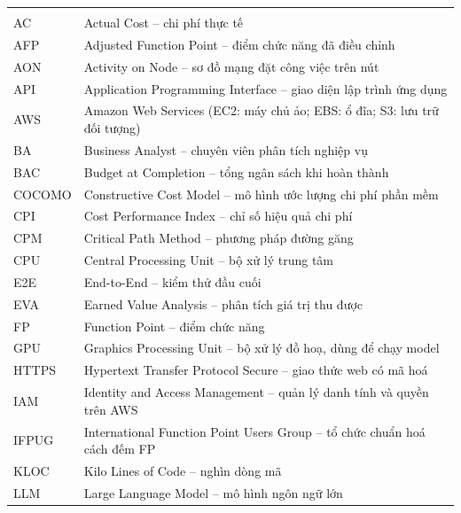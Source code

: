 \documentclass[12pt,a4paper]{report}
\begin{document}
\begingroup
  \begin{longtable}{@{}P{2.2cm}P{13.2cm}@{}}
    \toprule
     &  \\
    \midrule
    \endfirsthead
    \toprule
     &  \\
    \midrule
    \endhead
    \bottomrule
    \endlastfoot
    AC     & Actual Cost -- chi phí thực tế \\
    AFP    & Adjusted Function Point -- điểm chức năng đã điều chỉnh \\
    AON    & Activity on Node -- sơ đồ mạng đặt công việc trên nút \\
    API    & Application Programming Interface -- giao diện lập trình ứng dụng \\
    AWS    & Amazon Web Services (EC2: máy chủ ảo; EBS: ổ đĩa; S3: lưu trữ đối tượng) \\
    BA     & Business Analyst -- chuyên viên phân tích nghiệp vụ \\
    BAC    & Budget at Completion -- tổng ngân sách khi hoàn thành \\
    COCOMO & Constructive Cost Model -- mô hình ước lượng chi phí phần mềm \\
    CPI    & Cost Performance Index -- chỉ số hiệu quả chi phí \\
    CPM    & Critical Path Method -- phương pháp đường găng \\
    CPU    & Central Processing Unit -- bộ xử lý trung tâm \\
    E2E    & End-to-End -- kiểm thử đầu cuối \\
    EVA    & Earned Value Analysis -- phân tích giá trị thu được \\
    FP     & Function Point -- điểm chức năng \\
    GPU    & Graphics Processing Unit -- bộ xử lý đồ hoạ, dùng để chạy model \\
    HTTPS  & Hypertext Transfer Protocol Secure -- giao thức web có mã hoá \\
    IAM    & Identity and Access Management -- quản lý danh tính và quyền trên AWS \\
    IFPUG  & International Function Point Users Group -- tổ chức chuẩn hoá cách đếm FP \\
    KLOC   & Kilo Lines of Code -- nghìn dòng mã \\
    LLM    & Large Language Model -- mô hình ngôn ngữ lớn \\

\end{longtable}
\end{document}
